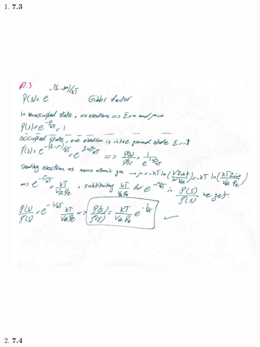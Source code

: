 \documentclass[fleqn]{article}
\begin{document}
  \begin{enumerate}
    \item \textbf{7.3}

      \begin{center}
        \includegraphics[height=16cm, width=17cm]{73.JPG}
      \end{center}

    \pagebreak
    
    \item \textbf{7.4}


\end{enumerate}
\end{document}
